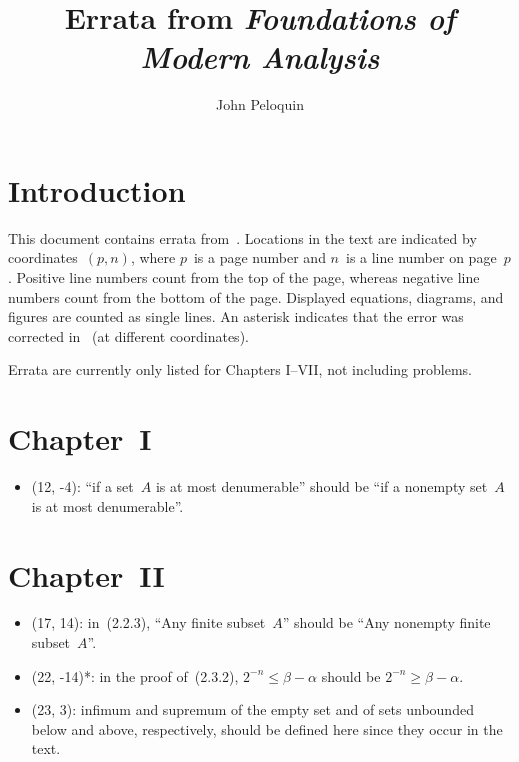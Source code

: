 \documentclass[letterpaper,12pt]{article}
\title{Errata from \textit{Foundations of Modern Analysis}}
\author{John Peloquin}
\date{}
\begin{document}
\maketitle
\section*{Introduction}
This document contains errata from~\cite{dieudonne8th}. Locations in the text are indicated by coordinates~\((p,n)\), where \(p\)~is a page number and \(n\)~is a line number on page~\(p\). Positive line numbers count from the top of the page, whereas negative line numbers count from the bottom of the page. Displayed equations, diagrams, and figures are counted as single lines. An asterisk indicates that the error was corrected in~\cite{dieudonne9th} (at different coordinates).

Errata are currently only listed for Chapters I--VII, not including problems.

\section*{Chapter~I}
\begin{itemize}
\item (12, -4): ``if a set~\(A\) is at most denumerable'' should be ``if a nonempty set~\(A\) is at most denumerable''.
\end{itemize}

\section*{Chapter~II}
\begin{itemize}
\item (17, 14): in~(2.2.3), ``Any finite subset~\(A\)'' should be ``Any nonempty finite subset~\(A\)''.
\item (22, -14)*: in the proof of~(2.3.2), \(2^{-n}\le\beta-\alpha\) should be \(2^{-n}\ge\beta-\alpha\).
\item (23, 3): infimum and supremum of the empty set and of sets unbounded below and above, respectively, should be defined here since they occur in the text.
\end{itemize}
\end{document}
